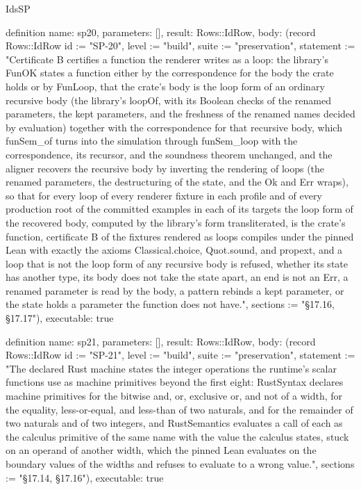 \begin{lexlean}{IdsSP}
\begin{semanticmodule}
definition{
  name: sp20,
  parameters: [],
  result: Rows::IdRow,
  body: (record Rows::IdRow {id := "SP-20", level := "build", suite := "preservation", statement := "Certificate B certifies a function the renderer writes as a loop: the library's FunOK states a function either by the correspondence for the body the crate holds or by FunLoop, that the crate's body is the loop form of an ordinary recursive body (the library's loopOf, with its Boolean checks of the renamed parameters, the kept parameters, and the freshness of the renamed names decided by evaluation) together with the correspondence for that recursive body, which funSem_of turns into the simulation through funSem_loop with the correspondence, its recursor, and the soundness theorem unchanged, and the aligner recovers the recursive body by inverting the rendering of loops (the renamed parameters, the destructuring of the state, and the Ok and Err wraps), so that for every loop of every renderer fixture in each profile and of every production root of the committed examples in each of its targets the loop form of the recovered body, computed by the library's form transliterated, is the crate's function, certificate B of the fixtures rendered as loops compiles under the pinned Lean with exactly the axioms Classical.choice, Quot.sound, and propext, and a loop that is not the loop form of any recursive body is refused, whether its state has another type, its body does not take the state apart, an end is not an Err, a renamed parameter is read by the body, a pattern rebinds a kept parameter, or the state holds a parameter the function does not have.", sections := "§17.16, §17.17"}),
  executable: true
}

definition{
  name: sp21,
  parameters: [],
  result: Rows::IdRow,
  body: (record Rows::IdRow {id := "SP-21", level := "build", suite := "preservation", statement := "The declared Rust machine states the integer operations the runtime's scalar functions use as machine primitives beyond the first eight: RustSyntax declares machine primitives for the bitwise and, or, exclusive or, and not of a width, for the equality, less-or-equal, and less-than of two naturals, and for the remainder of two naturals and of two integers, and RustSemantics evaluates a call of each as the calculus primitive of the same name with the value the calculus states, stuck on an operand of another width, which the pinned Lean evaluates on the boundary values of the widths and refuses to evaluate to a wrong value.", sections := "§17.14, §17.16"}),
  executable: true
}


\end{semanticmodule}
\end{lexlean}
